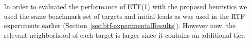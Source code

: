 \documentclass[journal]{IEEEtran}
\begin{document}






In order to evaluated the performance of ETF(1) with the proposed heuristics we used the same benchmark set of targets and initial leads as was used in the RTF experiments earlier (Section~\ref{sec:btf-experimentalResults}). However now, the relevant neighborhood of each target is larger since it contains an additional tier. 
\end{document}
